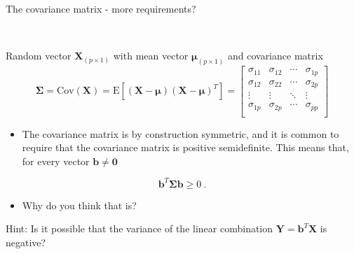 \documentclass[ignorenonframetext,]{beamer}
\providecommand{\tightlist}{%
  \setlength{\itemsep}{0pt}\setlength{\parskip}{0pt}}
\begin{document}
\begin{frame}

\begin{block}{The covariance matrix - more requirements?}

\(~\)

Random vector \(\boldsymbol{X}_{(p\times 1)}\) with mean vector
\(\boldsymbol{\mu}_{(p\times 1)}\) and covariance matrix
\[\boldsymbol\Sigma=\text{Cov}(\boldsymbol{X})=\text{E}[(\boldsymbol{X}-\boldsymbol{\mu})(\boldsymbol{X}-\boldsymbol{\mu})^T]=
\left[ \begin{array}{cccc}
    \sigma_{11} & \sigma_{12} & \cdots & \sigma_{1p}\\
    \sigma_{12} & \sigma_{22} & \cdots & \sigma_{2p}\\
    \vdots & \vdots & \ddots & \vdots\\
    \sigma_{1p} & \sigma_{2p} & \cdots & \sigma_{pp}\\
\end{array} \right]\]

\end{block}

\end{frame}

\begin{frame}

\begin{itemize}
\tightlist
\item
  The covariance matrix is by construction symmetric, and it is common
  to require that the covariance matrix is positive semidefinite. This
  means that, for every vector \(\boldsymbol{b}\neq \boldsymbol{0}\)
\end{itemize}

\[\boldsymbol{b}^T \boldsymbol{\Sigma} \boldsymbol{b} \geq 0 \ .\]

\begin{itemize}
\tightlist
\item
  Why do you think that is?
\end{itemize}

Hint: Is it possible that the variance of the linear combination
\(\boldsymbol{Y}=\boldsymbol{b}^T\boldsymbol{X}\) is negative?

\end{frame}
\end{document}
